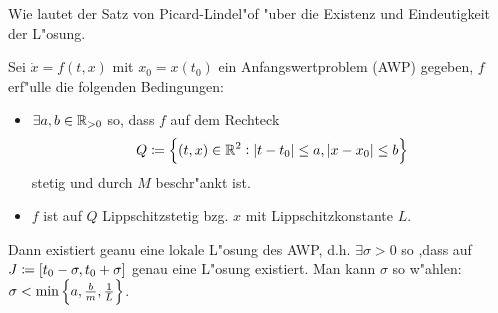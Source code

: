 \documentclass[9pt]{article}
\newcommand{\R}[1]{%
	\ifthenelse{\equal{#1}{}}
		{\mathbb{R}}
		{\mathbb{R}^{#1}}}%
\newenvironment{field}{}{\newpage}
\newif\ifnote
\newenvironment{note}{\notetrue}{\notefalse}
\newcommand{\localtag}{}
\newcommand{\globaltag}{}
\newcommand{\uuid}{}
\newcommand{\tags}[1]{
    \ifnote 
        \renewcommand{\localtag}{#1}
    \else
        \renewcommand{\globaltag}{#1}
    \fi 
    }
\newcommand{\xplain}[1]{\renewcommand{\uuid}{#1}}
\begin{document}
\begin{note}
	\xplain{UUID}
	\tags{satz, picard-lindeloef, 3.4.2}
	
	\begin{field}  %
		Wie lautet der Satz von Picard-Lindel"of "uber die Existenz und Eindeutigkeit der L"osung.
	\end{field}
	
	\begin{field}  %
		Sei $\dot{x} = f(t,x)$ mit $x_0= x(t_0)$ ein Anfangswertproblem (AWP) gegeben, $f$ erf"ulle die folgenden Bedingungen:
		\begin{itemize}
			\item $\exists a,b \in \R{}_{>0}$ so, dass $f$ auf dem Rechteck
			\begin{equation*}
				Q\coloneqq \qty{(t,x) \in \R{2}: \abs{t-t_0} \leq a, \abs{x-x_0} \leq b}
			\end{equation*}
			stetig und durch $M$ beschr"ankt ist. 
			\item $f$ ist auf $Q$ Lippschitzstetig bzg. $x$ mit Lippschitzkonstante $L$. 
		\end{itemize}
		Dann existiert geanu eine lokale L"osung des AWP, d.h. $\exists \sigma>0$ so ,dass auf
			$J\coloneqq \qty[t_0 - \sigma, t_0 + \sigma]$  genau eine L"osung existiert. Man kann $\sigma$ so w"ahlen: $\sigma < \min\qty{a, \frac{b}{m}, \frac{1}{L}}$.
	\end{field}
\end{note}
\end{document}
